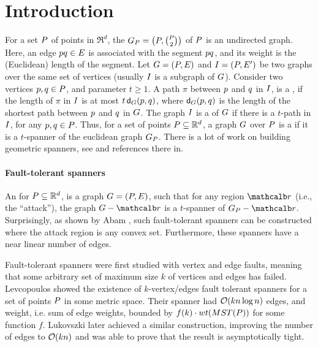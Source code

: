 \documentclass[12pt]{article}%
\begin{document}

\section{Introduction}

For a set $P$ of points in $\Re^d$, the 
$G_P = \bigl(P, \binom{P}{2}\bigr)$ of $P$ is an undirected
graph.  Here, an edge $p q \in E$ is associated with the segment
$pq$, and its weight is the (Euclidean) length of the segment.
Let $G=(P,E)$ and $I=(P,E')$ be two graphs over the same
set of vertices (usually $I$ is a subgraph of $G$). Consider two
vertices $p,q \in P$, and parameter $t \geq 1$.  A path $\pi$
between $p$ and $q$ in $I$, is a , if the length
of $\pi$ in $I$ is at most $t\,\dGZ{\G}{\pa}{\pb}$, where
$\dGZ{\G}{\pa}{\pb}$ is the length of the shortest path between $p$
and $q$ in $G$.  The graph $I$ is a  of $G$
if there is a $t$-path in $I$, for any $p,q\in P$.  Thus, for
a set of points $P\subseteq \mathbb{R}^d$, a graph $G$ over $P$ is a
 if it is a $t$-spanner of the euclidean graph
$G_P$. There is a lot of work on building geometric spanners, see
\cite{ns-gsn-07} and references there in.

\paragraph{Fault-tolerant spanners}

An  for $P\subseteq \mathbb{R}^d$, is a
graph $G=(P, E)$, such that for any region $\region$ (i.e., the
``attack''), the graph $\G \gminus \region$ is a $t$-spanner of
$\G_\PS - \region$. Surprisingly, as shown by Abam \etal
\cite{abfg-rftgs-09}, such fault-tolerant spanners can be constructed
where the attack region is any convex set. Furthermore, these spanners
have a near linear number of edges.

Fault-tolerant spanners were first studied with vertex and edge
faults, meaning that some arbitrary set of maximum size $k$ of
vertices and edges has failed. Levcopoulos \etal \cite{lns-iacfts-02}
showed the existence of $k$-vertex/edges fault tolerant spanners for a
set of points $P$ in some metric space. Their spanner had
$\mathcal{O}(kn\log n)$ edges, and weight, i.e. sum of edge weights, bounded by
$f(k)\cdot wt(MST(P))$ for some function $f$. Lukovszki
\cite{l-nrftgs-99} later achieved a similar construction, improving
the number of edges to $\mathcal{O}(kn)$ and was able to prove that the result
is asymptotically tight.
\end{document}
